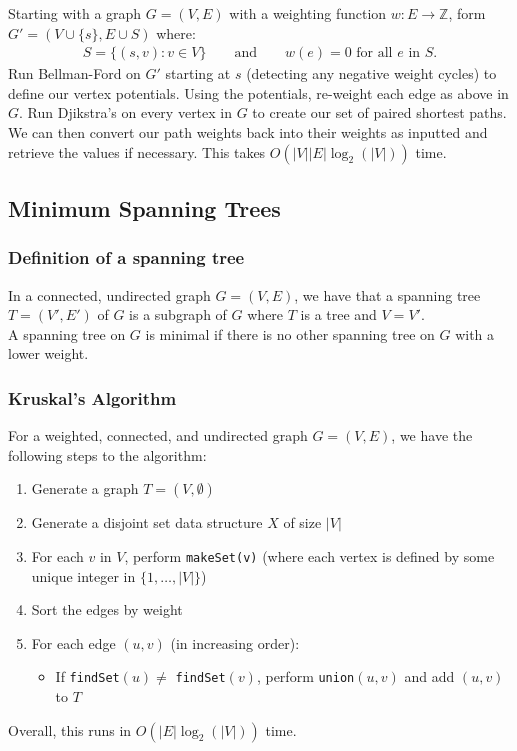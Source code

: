 \documentclass[a4paper, 12pt, twoside]{article}
\begin{document}
Starting with a graph $G = (V, E)$ with a weighting function $w : E \to \mathbb{Z}$,
form $G' = (V \cup \{s\}, E \cup S)$ where: \begin{gather*}
  S = \{(s, v) : v \in V\} \qquad \text{and} \qquad w(e) = 0 \text{ for all } e \text{ in } S.
\end{gather*} Run Bellman-Ford on $G'$ starting at $s$ (detecting any negative weight cycles)
to define our vertex potentials. Using the potentials, re-weight each edge as above
in $G$. Run Djikstra's on every vertex in $G$ to create our set of paired shortest paths.
We can then convert our path weights back into their weights as inputted and retrieve the
values if necessary. This takes $O(|V||E|\log_2(|V|))$ time.

\subsection{Minimum Spanning Trees}

\subsubsection{Definition of a spanning tree}

In a connected, undirected graph $G = (V, E)$, we have that a
spanning tree $T = (V', E')$ of $G$ is a subgraph of $G$ where
$T$ is a tree and $V = V'$.
\\[\baselineskip]
A spanning tree on $G$ is minimal if there is no other spanning tree
on $G$ with a lower weight.

\subsubsection{Kruskal's Algorithm}

For a weighted, connected, and undirected graph $G = (V, E)$, we have 
the following steps to the algorithm: \begin{enumerate}
  \item Generate a graph $T = (V, \emptyset)$
  \item Generate a disjoint set data structure $X$ of size $|V|$
  \item For each $v$ in $V$, perform \texttt{makeSet(v)} (where
  each vertex is defined by some unique integer in $\{1, \ldots, |V|\}$)
  \item Sort the edges by weight
  \item For each edge $(u, v)$ (in increasing order): \begin{itemize}
    \item If \texttt{findSet}$(u) \neq$ \texttt{findSet}$(v)$,
    perform \texttt{union}$(u, v)$ and add $(u, v)$ to $T$
  \end{itemize}
\end{enumerate} Overall, this runs in $O(|E| \log_2(|V|))$ time.
\end{document}
